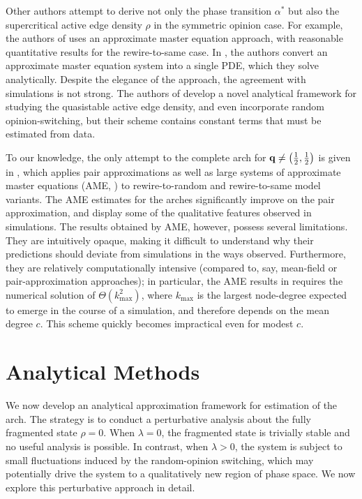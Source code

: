 \documentclass[review, onefignum, onetabnum]{siamart171218}
\begin{document}
		Other authors attempt to derive not only the phase transition $\alpha^*$ but also the supercritical active edge density $\rho$ in the symmetric opinion case. 
		For example, the authors of \cite{Demirel2012} uses an approximate master equation approach, with reasonable quantitative results for the rewire-to-same case. 
		In \cite{Silk2014}, the authors convert an approximate master equation system into a single PDE, which they solve analytically. 
		Despite the elegance of the approach, the agreement with simulations is not strong. 
		The authors of \cite{Ji2013}  develop a novel analytical framework for studying the quasistable active edge density, and even incorporate random opinion-switching, but their scheme contains constant terms that must be estimated from data. 
			
		To our knowledge, the only attempt to the complete arch for $\mathbf{q} \neq \left(\frac{1}{2}, \frac{1}{2}\right)$ is given in \cite{Durrett2012}, which applies pair approximations as well as large systems of approximate master equations (AME, \cite{Gleeson2013}) to rewire-to-random and rewire-to-same model variants. 
		The AME estimates for the arches significantly improve on the pair approximation, and display some of the qualitative features observed in simulations. 
		The results obtained by AME, however, possess several limitations. 
		They are intuitively opaque, making it difficult to understand why their predictions should deviate from simulations in the ways observed.  
		Furthermore, they are relatively computationally intensive (compared to, say, mean-field or pair-approximation approaches); in particular, the AME results in \cite{Durrett2012} requires the numerical solution of $\Theta(k_\mathrm{max}^2)$, where $k_\mathrm{max}$ is the largest node-degree expected to emerge in the course of a simulation, and therefore depends on the mean degree $c$. 
		This scheme quickly becomes impractical even for modest $c$. 

	\section{Analytical Methods}
	    We now develop an analytical approximation framework for estimation of the arch. 
	    The strategy is to conduct a perturbative analysis about the fully fragmented state $\rho = 0$. 
	    When $\lambda = 0$, the fragmented state is trivially stable and no useful analysis is possible. 
	    In contrast, when $\lambda > 0$, the system is subject to small fluctuations induced by the random-opinion switching, which may potentially drive the system to a qualitatively new region of phase space. 
	    We now explore this perturbative approach in detail. 
	    
\end{document}
